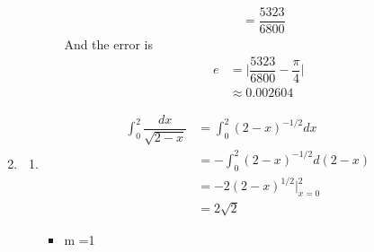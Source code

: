 \documentclass{article}
\begin{document}
\begin{enumerate}
\begin{enumerate}
\begin{itemize}
\begin{align*}
&=\dfrac{5323}{6800}
\end{align*}
And the error is
\begin{align*}
e&=\Big|\dfrac{5323}{6800}-\dfrac{\pi}{4}\Big|\\
&\approx 0.002604
\end{align*}
\end{itemize}
\end{enumerate}
\item
\begin{enumerate}
\item
\begin{align*}
\int_0^2 \dfrac{dx}{\sqrt{2-x}}&=\int_0^2 (2-x)^{-1/2}dx\\
&=-\int_0^2 (2-x)^{-1/2}d(2-x)\\
&=-2(2-x)^{1/2}|_{x=0}^2\\
&=2\sqrt{2}
\end{align*}
\begin{itemize}
\item  m =1


\end{itemize}
\end{enumerate}
\end{enumerate}
\end{document}
